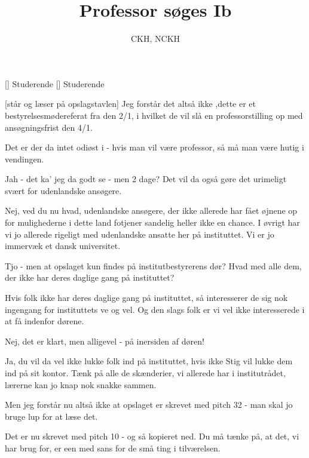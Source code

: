 \documentclass[a4paper,11pt]{article}
\title{Professor søges Ib}
\author{CKH, NCKH}
\begin{document}
\maketitle

\begin{roles}
  [] Studerende
  [] Studerende
\end{roles}

\begin{sketch}

  [står og læser på opslagstavlen] Jeg forstår det altså ikke
  ,dette er et bestyrelsesmødereferat fra den 2/1, i hvilket de vil
  slå en professorstilling op med ansøgningsfrist den 4/1.

   Det er der da intet odiøst i - hvis man vil være professor,
  så må man være hutig i vendingen.

   Jah - det ka' jeg da godt se - men 2 dage?  Det vil da også
  gøre det urimeligt svært for udenlandske ansøgere.

   Nej, ved du nu hvad, udenlandske ansøgere, der ikke
  allerede har fået øjnene op for mulighederne i dette land fotjener
  sandelig heller ikke en chance.  I øvrigt har vi jo allerede
  rigeligt med udenlandske ansatte her på instituttet.  Vi er jo
  immervæk et dansk universitet.

   Tjo - men at opslaget kun findes på institutbestyrerens
  dør?  Hvad med alle dem, der ikke har deres daglige gang på
  instituttet?

   Hvis folk ikke har deres daglige gang på instituttet, så
  interesserer de sig nok ingengang for instituttets ve og vel.  Og
  den slags folk er vi vel ikke interesserede i at få indenfor dørene.

   Nej, det er klart, men alligevel - på inersiden af døren!

   Ja, du vil da vel ikke lukke folk ind på instituttet, hvis
  ikke Stig vil lukke dem ind på sit kontor.  Tænk på alle de
  skænderier, vi allerede har i institutrådet, lærerne kan jo knap nok
  snakke sammen. 

   Men jeg forstår nu altså ikke at opslaget er skrevet med
  pitch 32 - man skal jo bruge lup for at læse det.

   Det er nu skrevet med pitch 10 - og så kopieret ned.  Du må
  tænke på, at det, vi har brug for, er een med sans for de små ting i
  tilværelsen.


\end{sketch}
\end{document}
